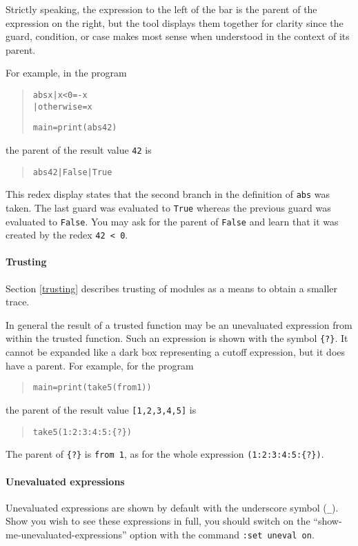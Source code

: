 \documentclass[12pt]{article}
\newenvironment{code}{\begin{quote}\begin{alltt}}{\end{alltt}\end{quote}}
\newcommand{\com}[1]{\texttt{#1}}
\begin{document}
Strictly speaking, the expression to the left of the bar is the parent
of the expression on the right, but the tool displays them together
for clarity since the guard, condition, or case makes most sense
when understood in the context of its parent.

For example, in the program
\begin{code} 
abs x | x < 0 = -x
      | otherwise = x 

main = print (abs 42)
\end{code}
the parent of the result value \texttt{42} is
\begin{code}
abs 42 | False | True
\end{code}
This redex display states that the second branch in the definition of
\texttt{abs} was taken. The last guard was evaluated to \texttt{True}
whereas the previous guard was evaluated to \texttt{False}. You may
ask for the parent of \texttt{False} and learn that it was created
by the redex \texttt{42 < 0}.

\paragraph{Trusting}

Section \ref{trusting} describes trusting of modules as a means to
obtain a smaller trace.

In general the result of a trusted function may be an unevaluated
expression from within the trusted function. Such an expression is
shown with the symbol \texttt{\{?\}}. It cannot be expanded like a
dark box representing a cutoff expression, but it does have a parent.
For example, for the program

\begin{code}
main = print (take 5 (from 1))
\end{code}  
the parent of the result value \texttt{[1,2,3,4,5]} is
\begin{code}
take 5 (1:2:3:4:5:\{?\})
\end{code}
The parent of \texttt{\{?\}} is \texttt{from 1}, as for the whole expression
\texttt{(1:2:3:4:5:\{?\})}.

\paragraph{Unevaluated expressions}

Unevaluated expressions are shown by default with the underscore
symbol (\texttt{\_}).  Show you wish to see these expressions in
full, you should switch on the ``show-me-unevaluated-expressions''
option with the command \com{:set uneval on}.
\end{document}
